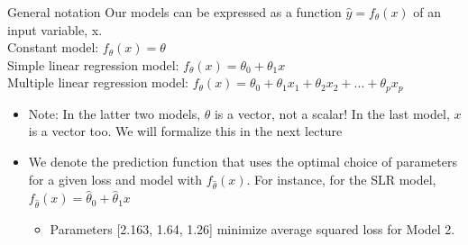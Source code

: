 \documentclass[aspectratio=169]{../latex_main/tntbeamer}  %
\begin{document}
	
	
	\begin{frame}{General notation}
        Our models can be expressed as a function         $\hat{y} = f_\theta(x)$             of an input variable, x.\\
        Constant model: $f_\theta (x) = \theta$\\
        Simple linear regression model: $f_\theta(x) = \theta_0 + \theta_1x$\\
        Multiple linear regression model: $f_\theta (x) = \theta_0 + \theta_1x_1 + \theta_2x_2 + ... + \theta_px_p $\\
        \bigskip
        \begin{itemize}
            \item Note: In the latter two models, $\theta$ is a vector, not a scalar! In the last model, $x$ is a vector too. We will formalize this in the next lecture
            \item We denote the prediction function that uses the optimal choice of parameters for a given loss and model with $f_\hat{\theta}(x)$. For instance, for the SLR  model, $f_\hat{\theta}(x) = \hat{\theta}_0 + \hat{\theta}_1x$                              
            \begin{itemize}
                \item Parameters [2.163, 1.64, 1.26] minimize average squared loss for Model 2.
            \end{itemize}
        \end{itemize}

	\end{frame}
\end{document}
